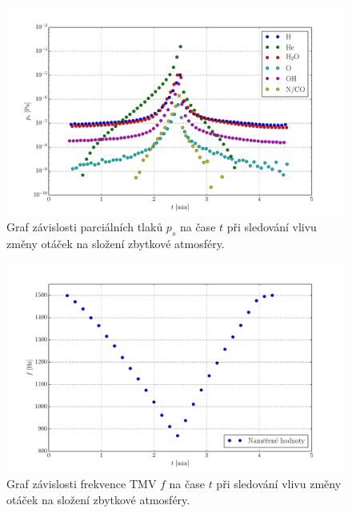 \documentclass[english]{article}
\begin{document}
\begin{figure}[h!]
	\begin{center}
		\vspace*{-1.5cm}
		\includegraphics[width=\linewidth]{../plt/03_otacky.pdf}
		\vspace*{-0.8cm}
		\caption{Graf závislosti parciálních tlaků $p_s$ na čase $t$ při sledování vlivu změny otáček na složení zbytkové atmosféry. } %
		\label{fig:g_otacky}
	\end{center}
\end{figure}

\begin{figure}[h!]
	\begin{center}
		\vspace*{-1.5cm}
		\includegraphics[width=\linewidth]{../plt/03_otacky_1.pdf}
		\vspace*{-0.8cm}
		\caption{Graf závislosti frekvence TMV $f$ na čase $t$ při sledování vlivu změny otáček na složení zbytkové atmosféry. } %
		\label{fig:g_otacky_1}
	\end{center}
\end{figure}

\end{document}
